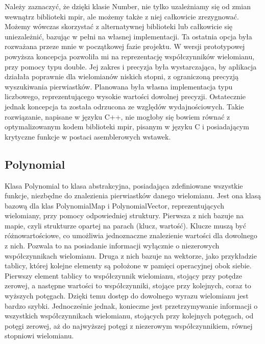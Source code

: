 Należy zaznaczyć, że dzięki klasie Number, nie tylko uzależniamy się od zmian wewnątrz biblioteki mpir, ale możemy także z niej całkowicie zrezygnować. Możemy wówczas skorzystać z alternatywnej biblioteki lub całkowicie się uniezależnić, bazując w pełni na własnej implementacji. Ta ostatnia opcja była rozważana przeze mnie w początkowej fazie projektu. W wersji prototypowej powyższa koncepcja pozwoliła mi na reprezentację współczynników wielomianu, przy pomocy typu double. Jej zakres i precyzja była wystarczająca, by aplikacja działała poprawnie dla wielomianów niskich stopni, z ograniczoną precyzją wyszukiwania pierwiastków. Planowana była własna implementacja typu liczbowego, reprezentującego wysokie wartości dowolnej precyzji. Ostatecznie jednak koncepcja ta została odrzucona ze względów wydajnościowych. Takie rozwiązanie, napisane w języku C++, nie mogłoby się bowiem równać z optymalizowanym kodem biblioteki mpir, pisanym w języku C i posiadającym krytyczne funkcje w postaci asemblerowych wstawek.

\subsection{Polynomial}

Klasa Polynomial to klasa abstrakcyjna, posiadająca zdefiniowane wszystkie funkcje, niezbędne do znalezienia pierwiastków danego wielomianu. Jest ona klasą bazową dla klas PolynomialMap i PolynomialVector, reprezentujących wielomiany, przy pomocy odpowiedniej struktury. Pierwsza z nich bazuje na mapie, czyli strukturze opartej na parach (klucz, wartość). Klucze muszą być różnowartościowe, co umożliwia jednoznaczne znalezienie wartości dla dowolnego z nich. Pozwala to na posiadanie informacji wyłącznie o niezerowych współczynnikach wielomianu. Druga z nich bazuje na wektorze, jako przykładzie tablicy, której kolejne elementy są położone w pamięci operacyjnej obok siebie. Pierwszy element tablicy to współczynnik wielomianu, stojący przy potędze zerowej, a następne wartości to współczynniki, stojące przy kolejnych, coraz to wyższych potęgach. Dzięki temu dostęp do dowolnego wyrazu wielomianu jest bardzo szybki. Jednocześnie jednak, konieczne jest przetrzymywanie informacji o wszystkich współczynnikach wielomianu, stojących przy kolejnych potęgach, od potęgi zerowej, aż do najwyższej potęgi z niezerowym współczynnikiem, równej stopniowi wielomianu.

